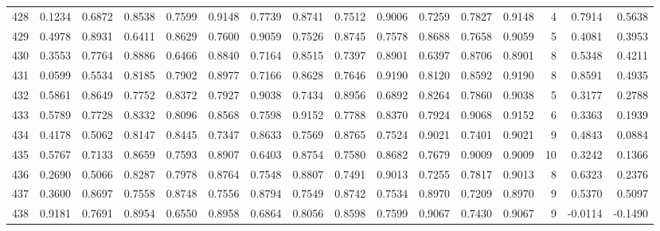 \begin{tabular}{lrrrrrrrrrrrrrrr}
428 &      0.1234 &  0.6872 &  0.8538 &  0.7599 &  0.9148 &  0.7739 &  0.8741 &  0.7512 &  0.9006 &  0.7259 &   0.7827 &     0.9148 &      4 &                    0.7914 &                     0.5638 \\
429 &      0.4978 &  0.8931 &  0.6411 &  0.8629 &  0.7600 &  0.9059 &  0.7526 &  0.8745 &  0.7578 &  0.8688 &   0.7658 &     0.9059 &      5 &                    0.4081 &                     0.3953 \\
430 &      0.3553 &  0.7764 &  0.8886 &  0.6466 &  0.8840 &  0.7164 &  0.8515 &  0.7397 &  0.8901 &  0.6397 &   0.8706 &     0.8901 &      8 &                    0.5348 &                     0.4211 \\
431 &      0.0599 &  0.5534 &  0.8185 &  0.7902 &  0.8977 &  0.7166 &  0.8628 &  0.7646 &  0.9190 &  0.8120 &   0.8592 &     0.9190 &      8 &                    0.8591 &                     0.4935 \\
432 &      0.5861 &  0.8649 &  0.7752 &  0.8372 &  0.7927 &  0.9038 &  0.7434 &  0.8956 &  0.6892 &  0.8264 &   0.7860 &     0.9038 &      5 &                    0.3177 &                     0.2788 \\
433 &      0.5789 &  0.7728 &  0.8332 &  0.8096 &  0.8568 &  0.7598 &  0.9152 &  0.7788 &  0.8370 &  0.7924 &   0.9068 &     0.9152 &      6 &                    0.3363 &                     0.1939 \\
434 &      0.4178 &  0.5062 &  0.8147 &  0.8445 &  0.7347 &  0.8633 &  0.7569 &  0.8765 &  0.7524 &  0.9021 &   0.7401 &     0.9021 &      9 &                    0.4843 &                     0.0884 \\
435 &      0.5767 &  0.7133 &  0.8659 &  0.7593 &  0.8907 &  0.6403 &  0.8754 &  0.7580 &  0.8682 &  0.7679 &   0.9009 &     0.9009 &     10 &                    0.3242 &                     0.1366 \\
436 &      0.2690 &  0.5066 &  0.8287 &  0.7978 &  0.8764 &  0.7548 &  0.8807 &  0.7491 &  0.9013 &  0.7255 &   0.7817 &     0.9013 &      8 &                    0.6323 &                     0.2376 \\
437 &      0.3600 &  0.8697 &  0.7558 &  0.8748 &  0.7556 &  0.8794 &  0.7549 &  0.8742 &  0.7534 &  0.8970 &   0.7209 &     0.8970 &      9 &                    0.5370 &                     0.5097 \\
438 &      0.9181 &  0.7691 &  0.8954 &  0.6550 &  0.8958 &  0.6864 &  0.8056 &  0.8598 &  0.7599 &  0.9067 &   0.7430 &     0.9067 &      9 &                   -0.0114 &                    -0.1490 \\

\end{tabular}
